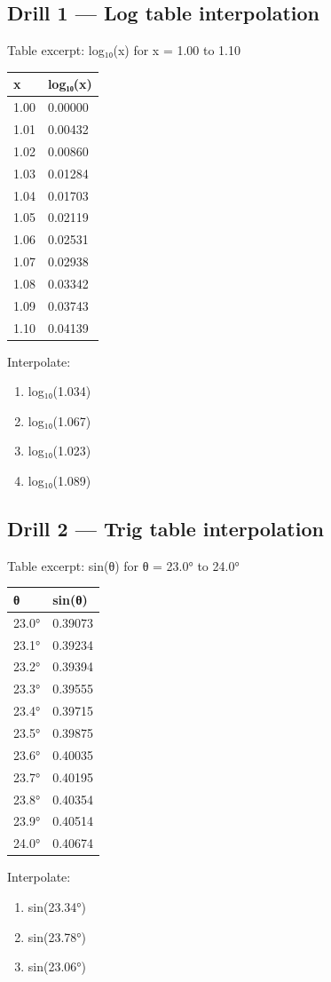 \documentclass[
  10pt,
]{article}
\providecommand{\tightlist}{%
  \setlength{\itemsep}{0pt}\setlength{\parskip}{0pt}}
\begin{document}
\hypertarget{drill-1-log-table-interpolation}{%
\subsection{Drill 1 --- Log table
interpolation}\label{drill-1-log-table-interpolation}}

Table excerpt: log₁₀(x) for x = 1.00 to 1.10

\begin{longtable}[]{@{}ll@{}}
\toprule
x & log₁₀(x)\tabularnewline
\midrule
\endhead
1.00 & 0.00000\tabularnewline
1.01 & 0.00432\tabularnewline
1.02 & 0.00860\tabularnewline
1.03 & 0.01284\tabularnewline
1.04 & 0.01703\tabularnewline
1.05 & 0.02119\tabularnewline
1.06 & 0.02531\tabularnewline
1.07 & 0.02938\tabularnewline
1.08 & 0.03342\tabularnewline
1.09 & 0.03743\tabularnewline
1.10 & 0.04139\tabularnewline
\bottomrule
\end{longtable}

Interpolate:

\begin{enumerate}
\def\labelenumi{\arabic{enumi}.}
\tightlist
\item
  log₁₀(1.034)
\item
  log₁₀(1.067)
\item
  log₁₀(1.023)
\item
  log₁₀(1.089)
\end{enumerate}

\hypertarget{drill-2-trig-table-interpolation}{%
\subsection{Drill 2 --- Trig table
interpolation}\label{drill-2-trig-table-interpolation}}

Table excerpt: sin(θ) for θ = 23.0° to 24.0°

\begin{longtable}[]{@{}ll@{}}
\toprule
θ & sin(θ)\tabularnewline
\midrule
\endhead
23.0° & 0.39073\tabularnewline
23.1° & 0.39234\tabularnewline
23.2° & 0.39394\tabularnewline
23.3° & 0.39555\tabularnewline
23.4° & 0.39715\tabularnewline
23.5° & 0.39875\tabularnewline
23.6° & 0.40035\tabularnewline
23.7° & 0.40195\tabularnewline
23.8° & 0.40354\tabularnewline
23.9° & 0.40514\tabularnewline
24.0° & 0.40674\tabularnewline
\bottomrule
\end{longtable}

Interpolate:

\begin{enumerate}
\def\labelenumi{\arabic{enumi}.}
\tightlist
\item
  sin(23.34°)
\item
  sin(23.78°)
\item
  sin(23.06°)
\end{enumerate}
\end{document}
